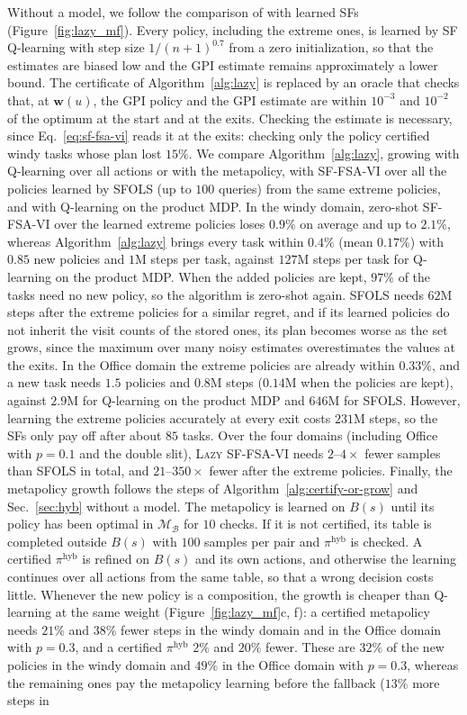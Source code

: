 \documentclass[11pt]{article}
\begin{document}
Without a model, we follow the comparison of \cite{kuric_planning_2024} with learned SFs (Figure~\ref{fig:lazy_mf}). Every policy, including the extreme ones, is learned by SF Q-learning with step size $1/(n+1)^{0.7}$ from a zero initialization, so that the estimates are biased low and the GPI estimate remains approximately a lower bound. The certificate of Algorithm~\ref{alg:lazy} is replaced by an oracle that checks that, at $\mathbf{w}(u)$, the GPI policy and the GPI estimate are within $10^{-3}$ and $10^{-2}$ of the optimum at the start and at the exits. Checking the estimate is necessary, since Eq.~\eqref{eq:sf-fsa-vi} reads it at the exits: checking only the policy certified windy tasks whose plan lost $15\%$. We compare Algorithm~\ref{alg:lazy}, growing with Q-learning over all actions or with the metapolicy, with SF-FSA-VI over all the policies learned by SFOLS (up to $100$ queries) from the same extreme policies, and with Q-learning on the product MDP. In the windy domain, zero-shot SF-FSA-VI over the learned extreme policies loses $0.9\%$ on average and up to $2.1\%$, whereas Algorithm~\ref{alg:lazy} brings every task within $0.4\%$ (mean $0.17\%$) with $0.85$ new policies and $1$M steps per task, against $127$M steps per task for Q-learning on the product MDP. When the added policies are kept, $97\%$ of the tasks need no new policy, so the algorithm is zero-shot again. SFOLS needs $62$M steps after the extreme policies for a similar regret, and if its learned policies do not inherit the visit counts of the stored ones, its plan becomes worse as the set grows, since the maximum over many noisy estimates overestimates the values at the exits. In the Office domain the extreme policies are already within $0.33\%$, and a new task needs $1.5$ policies and $0.8$M steps ($0.14$M when the policies are kept), against $2.9$M for Q-learning on the product MDP and $646$M for SFOLS. However, learning the extreme policies accurately at every exit costs $231$M steps, so the SFs only pay off after about $85$ tasks. Over the four domains (including Office with $p = 0.1$ and the double slit), \textsc{Lazy SF-FSA-VI} needs $2$--$4\times$ fewer samples than SFOLS in total, and $21$--$350\times$ fewer after the extreme policies. Finally, the metapolicy growth follows the steps of Algorithm~\ref{alg:certify-or-grow} and Sec.~\ref{sec:hyb} without a model. The metapolicy is learned on $B(s)$ until its policy has been optimal in $\mathcal{M}_{\mathcal{B}}$ for $10$ checks. If it is not certified, its table is completed outside $B(s)$ with $100$ samples per pair and $\pi^{\mathrm{hyb}}$ is checked. A certified $\pi^{\mathrm{hyb}}$ is refined on $B(s)$ and its own actions, and otherwise the learning continues over all actions from the same table, so that a wrong decision costs little. Whenever the new policy is a composition, the growth is cheaper than Q-learning at the same weight (Figure~\ref{fig:lazy_mf}c, f): a certified metapolicy needs $21\%$ and $38\%$ fewer steps in the windy domain and in the Office domain with $p = 0.3$, and a certified $\pi^{\mathrm{hyb}}$ $2\%$ and $20\%$ fewer. These are $32\%$ of the new policies in the windy domain and $49\%$ in the Office domain with $p = 0.3$, whereas the remaining ones pay the metapolicy learning before the fallback ($13\%$ more steps in 
\end{document}
